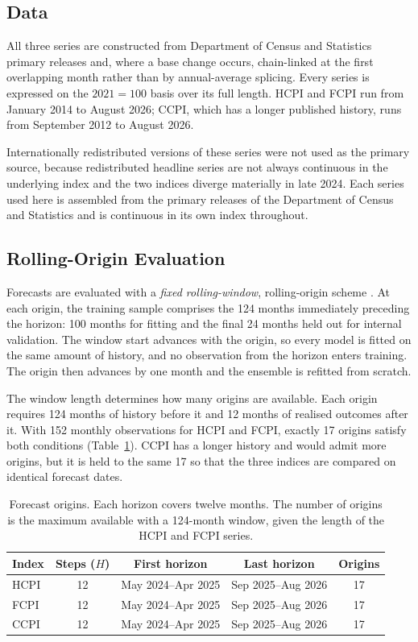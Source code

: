 \documentclass[12pt]{article}
\begin{document}
\subsection{Data}
\label{sec:method-data}

All three series are constructed from Department of Census and Statistics
primary releases and, where a base change occurs, chain-linked at the first
overlapping month rather than by annual-average splicing. Every series is
expressed on the $2021 = 100$ basis over its full length. HCPI and FCPI run
from January 2014 to August 2026; CCPI, which has a longer published history,
runs from September 2012 to August 2026.

Internationally redistributed versions of these series were not used as the
primary source, because redistributed headline series are not always continuous
in the underlying index and the two indices diverge materially in late 2024.
Each series used here is assembled from the primary releases of the Department
of Census and Statistics and is continuous in its own index throughout.

\subsection{Rolling-Origin Evaluation}
\label{sec:method-rolling}

Forecasts are evaluated with a \emph{fixed rolling-window}, rolling-origin
scheme \citep{tashman2000}. At each origin, the training sample comprises the
124 months immediately preceding the horizon: 100 months for fitting and the
final 24 months held out for internal validation. The window start advances
with the origin, so every model is fitted on the same amount of history, and
no observation from the horizon enters training. The origin then advances by
one month and the ensemble is refitted from scratch.

The window length determines how many origins are available. Each origin
requires 124 months of history before it and 12 months of realised outcomes
after it. With 152 monthly observations for HCPI and FCPI, exactly 17 origins
satisfy both conditions (Table~\ref{tab:origins}). CCPI has a longer history
and would admit more origins, but it is held to the same 17 so that the three
indices are compared on identical forecast dates.

\begin{table}[htbp]
\centering
\caption{Forecast origins. Each horizon covers twelve months. The number of
origins is the maximum available with a 124-month window, given the length of
the HCPI and FCPI series.}
\label{tab:origins}
\begin{tabular}{lcccc}
\toprule
Index & Steps ($H$) & First horizon & Last horizon & Origins \\
\midrule
HCPI & 12 & May 2024--Apr 2025 & Sep 2025--Aug 2026 & 17 \\
FCPI & 12 & May 2024--Apr 2025 & Sep 2025--Aug 2026 & 17 \\
CCPI & 12 & May 2024--Apr 2025 & Sep 2025--Aug 2026 & 17 \\
\bottomrule
\end{tabular}
\end{table}
\end{document}
